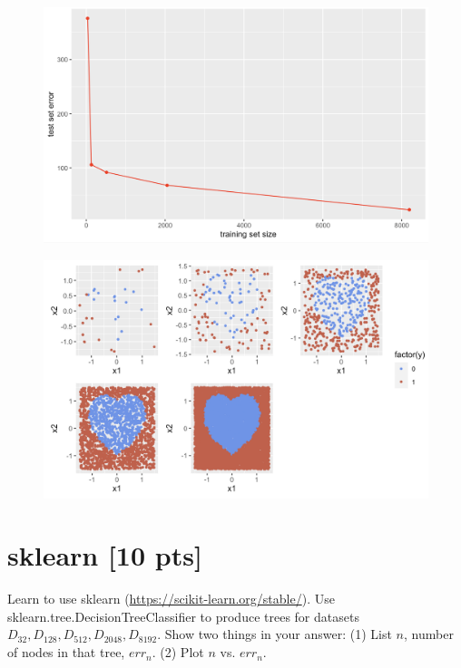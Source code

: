 \documentclass[a4paper]{article}
\theoremstyle{definition}
\begin{document}
\begin{enumerate}
  \begin{figure}[htbp]
    \centerline{\includegraphics[scale=0.5]{Q7b.png}}
  \end{figure}

  \begin{figure}[htbp]
    \centerline{\includegraphics[scale=0.75]{Q7c.png}}
  \end{figure}
  
\end{enumerate}

\pagebreak

\section{sklearn [10 pts]}
Learn to use sklearn (\url{https://scikit-learn.org/stable/}).
Use sklearn.tree.DecisionTreeClassifier to produce trees for datasets $D_{32}, D_{128}, D_{512}, D_{2048}, D_{8192}$.  Show two things in your answer: (1) List $n$, number of nodes in that tree, $err_n$. (2) Plot $n$ vs. $err_n$. \\
\end{document}
